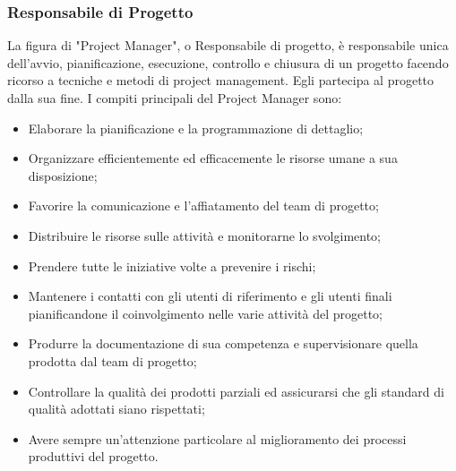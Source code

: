                 \subsubsection{Responsabile di Progetto}
                    La figura di "Project Manager", o Responsabile di progetto, è responsabile unica dell'avvio, pianificazione, esecuzione, controllo e chiusura di un progetto facendo ricorso a tecniche e metodi  di project management. Egli partecipa al progetto dalla sua  fine.
                    \newline
                    I compiti principali del Project Manager sono:
                    \begin{itemize}
                        \item Elaborare la pianificazione e la programmazione di dettaglio;
                        \item Organizzare efficientemente ed efficacemente le risorse umane a sua disposizione;
                        \item Favorire la comunicazione e l'affiatamento del team di progetto;
                        \item Distribuire le risorse sulle attività e monitorarne lo svolgimento;
                        \item Prendere tutte le iniziative volte a prevenire i rischi;
                        \item Mantenere i contatti con gli utenti di riferimento e gli utenti finali pianificandone il coinvolgimento nelle varie attività del progetto;
                        \item Produrre la documentazione di sua competenza e supervisionare quella prodotta dal team di progetto;
                        \item Controllare la qualità dei prodotti parziali ed assicurarsi che gli standard di qualità adottati siano rispettati;
                        \item Avere sempre un'attenzione particolare al miglioramento dei processi produttivi del progetto.
                    \end{itemize}
